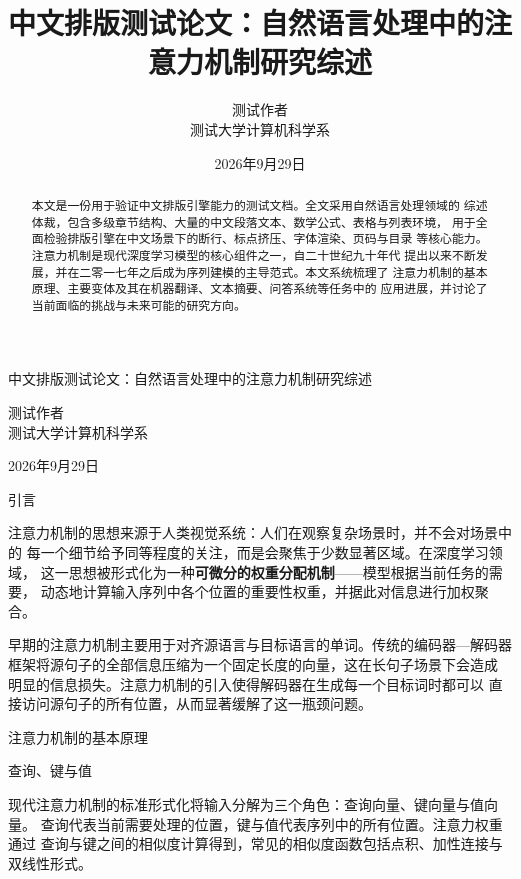 \documentclass[12pt]{article}
\begin{document}
\zhf

\title{中文排版测试论文：自然语言处理中的注意力机制研究综述}
\author{测试作者\\测试大学计算机科学系}
\date{2026年9月29日}
\begingroup
\centering
{\zhlargebf 中文排版测试论文：自然语言处理中的注意力机制研究综述\par}
\vskip 10pt
{\zhf 测试作者\\测试大学计算机科学系\par}
\vskip 6pt
{\zhf 2026年9月29日\par}
\endgroup
\vskip 24pt

\begin{abstract}
本文是一份用于验证中文排版引擎能力的测试文档。全文采用自然语言处理领域的
综述体裁，包含多级章节结构、大量的中文段落文本、数学公式、表格与列表环境，
用于全面检验排版引擎在中文场景下的断行、标点挤压、字体渲染、页码与目录
等核心能力。注意力机制是现代深度学习模型的核心组件之一，自二十世纪九十年代
提出以来不断发展，并在二零一七年之后成为序列建模的主导范式。本文系统梳理了
注意力机制的基本原理、主要变体及其在机器翻译、文本摘要、问答系统等任务中的
应用进展，并讨论了当前面临的挑战与未来可能的研究方向。
\end{abstract}

\par\vskip 20pt{\zhhei 引言\par}\vskip 10pt

注意力机制的思想来源于人类视觉系统：人们在观察复杂场景时，并不会对场景中的
每一个细节给予同等程度的关注，而是会聚焦于少数显著区域。在深度学习领域，
这一思想被形式化为一种\textbf{可微分的权重分配机制}——模型根据当前任务的需要，
动态地计算输入序列中各个位置的重要性权重，并据此对信息进行加权聚合。

早期的注意力机制主要用于对齐源语言与目标语言的单词。传统的编码器—解码器
框架将源句子的全部信息压缩为一个固定长度的向量，这在长句子场景下会造成
明显的信息损失。注意力机制的引入使得解码器在生成每一个目标词时都可以
直接访问源句子的所有位置，从而显著缓解了这一瓶颈问题。

\par\vskip 20pt{\zhhei 注意力机制的基本原理\par}\vskip 10pt

\par\vskip 14pt{\zhhei 查询、键与值\par}\vskip 8pt

现代注意力机制的标准形式化将输入分解为三个角色：查询向量、键向量与值向量。
查询代表当前需要处理的位置，键与值代表序列中的所有位置。注意力权重通过
查询与键之间的相似度计算得到，常见的相似度函数包括点积、加性连接与
双线性形式。
\end{document}
